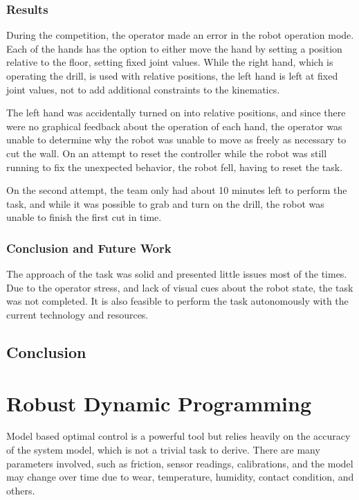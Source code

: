 \documentclass[12pt]{report}
\begin{document}
\subsection{Results}
During the competition, the operator made an error in the robot operation mode. Each of the hands has the option to either move the hand by setting a position relative to the floor, setting fixed joint values. While the right hand, which is operating the drill, is used with relative positions, the left hand is left at fixed joint values, not to add additional constraints to the kinematics. 

The left hand was accidentally turned on into relative positions, and since there were no graphical feedback about the operation of each hand, the operator was unable to determine why the robot was unable to move as freely as necessary to cut the wall. On an attempt to reset the controller while the robot was still running to fix the unexpected behavior, the robot fell, having to reset the task. 

On the second attempt, the team only had about 10 minutes left to perform the task, and while it was possible to grab and turn on the drill, the robot was unable to finish the first cut in time.

\subsection{Conclusion and Future Work}

The approach of the task was solid and presented little issues most of the times. Due to the operator stress, and lack of visual cues about the robot state, the task was not completed. It is also feasible to perform the task autonomously with the current technology and resources. 

\section{Conclusion}

\chapter{Robust Dynamic Programming}
Model based optimal control is a powerful tool but relies heavily on the accuracy of the system model, which is not a trivial task to derive. There are many parameters involved, such as friction, sensor readings, calibrations, and the model may change over time due to wear, temperature, humidity, contact condition, and others.
\end{document}
